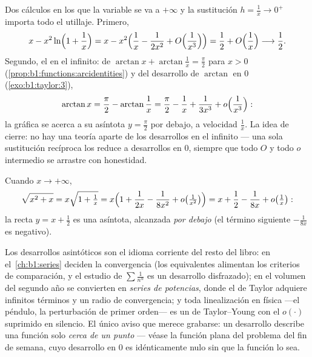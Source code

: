 \begin{example}\label{ex:b1:taylor:atinfinity}
Dos cálculos en los que la variable se va a $+\infty$ y la
sustitución $h = \frac1x \to 0^+$ importa todo el utillaje. Primero,
\[
x - x^2\ln\Bigl(1 + \frac1x\Bigr)
= x - x^2\Bigl(\frac1x - \frac{1}{2x^2} +
O\Bigl(\frac{1}{x^3}\Bigr)\Bigr)
= \frac12 + O\Bigl(\frac1x\Bigr) \longrightarrow \frac12 .
\]
Segundo, el  en el infinito: de
$\arctan x + \arctan\frac1x = \frac\pi2$ para $x > 0$
(\cref{prop:b1:functions:arcidentities}) y del desarrollo de
$\arctan$ en $0$ (\cref{exo:b1:taylor:3}),
\[
\arctan x = \frac\pi2 - \arctan\frac1x
= \frac\pi2 - \frac1x + \frac{1}{3x^3} +
o\Bigl(\frac{1}{x^3}\Bigr) :
\]
la gráfica se acerca a su asíntota $y = \frac\pi2$ por debajo, a
velocidad $\frac1x$. La idea de cierre: no hay una teoría aparte de
los desarrollos en el infinito --- una sola sustitución recíproca los
reduce a desarrollos en $0$, siempre que todo $O$ y todo $o$
intermedio se arrastre con honestidad.
\end{example}

\begin{example}\label{ex:b1:taylor:asymptote}
Cuando $x \to +\infty$,
\[
\sqrt{x^2 + x} = x\sqrt{1 + \tfrac1x}
= x\Bigl(1 + \frac{1}{2x} - \frac{1}{8x^2} + o\bigl(\tfrac{1}{x^2}\bigr)\Bigr)
= x + \frac12 - \frac{1}{8x} + o\bigl(\tfrac 1x\bigr):
\]
la recta $y = x + \frac12$ es una asíntota, alcanzada \emph{por
debajo} (el término siguiente $-\frac{1}{8x}$ es negativo).
\end{example}

\begin{remark}
Los desarrollos asintóticos son el idioma corriente del resto del
libro: en el~\cref{ch:b1:series} deciden la convergencia (los
equivalentes alimentan los criterios de comparación, y el estudio de
$\sum \frac{1}{n^\alpha}$ es un desarrollo disfrazado); en el volumen
del segundo año se convierten en \emph{series de potencias}, donde el
 de Taylor adquiere infinitos términos y un radio de
convergencia; y toda linealización en física ---el péndulo, la
perturbación de primer orden--- es un  de Taylor--Young con
el $o(\cdot)$ suprimido en silencio. El único aviso que merece
grabarse: un desarrollo describe una función solo \emph{cerca de un
punto} --- véase la función plana del problema del fin de semana,
cuyo desarrollo en $0$ es idénticamente nulo sin que la función lo sea.
\end{remark}

